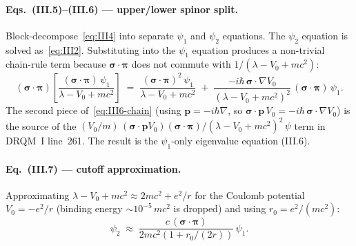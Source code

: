 \paragraph{Eqs.~(III.5)--(III.6) --- upper/lower spinor split.}
Block-decompose~\eqref{eq:III4} into separate $\psi_1$ and $\psi_2$
equations. The $\psi_2$ equation is solved as~\eqref{eq:III2}. Substituting
into the $\psi_1$ equation produces a non-trivial chain-rule term because
$\boldsymbol\sigma\!\cdot\!\boldsymbol\pi$ does not commute with
$1/(\lambda - V_0 + m c^2)$:
\begin{equation}
\label{eq:III6-chain}
(\boldsymbol\sigma\!\cdot\!\boldsymbol\pi)\!\left[
\frac{(\boldsymbol\sigma\!\cdot\!\boldsymbol\pi)\,\psi_1}
     {\lambda - V_0 + m c^2}\right]
\;=\;
\frac{(\boldsymbol\sigma\!\cdot\!\boldsymbol\pi)^2\,\psi_1}
     {\lambda - V_0 + m c^2}
\;+\;
\frac{-i\hbar\,\boldsymbol\sigma\!\cdot\!\nabla V_0}
     {(\lambda - V_0 + m c^2)^2}\,
(\boldsymbol\sigma\!\cdot\!\boldsymbol\pi)\,\psi_1.
\end{equation}
The second piece of~\eqref{eq:III6-chain} (using
$\mathbf{p} = -i\hbar\nabla$, so $\boldsymbol\sigma\!\cdot\!\mathbf{p}\,V_0
= -i\hbar\,\boldsymbol\sigma\!\cdot\!\nabla V_0$) is the source of the
$(V_0/m)\,(\boldsymbol\sigma\!\cdot\!\mathbf{p}V_0)
(\boldsymbol\sigma\!\cdot\!\boldsymbol\pi)/(\lambda - V_0 + m c^2)^2\,\psi$
term in DRQM~I line~261. The result is the $\psi_1$-only eigenvalue
equation (III.6).

\paragraph{Eq.~(III.7) --- cutoff approximation.}
Approximating $\lambda - V_0 + m c^2 \approx 2 m c^2 + e^2/r$ for the
Coulomb potential $V_0 = -e^2/r$ (binding energy $\sim 10^{-5}\,m c^2$ is
dropped) and using $r_0 = e^2/(m c^2)$:
\begin{equation}
\label{eq:III7}
\psi_2 \;\approx\; \frac{c\,(\boldsymbol\sigma\!\cdot\!\boldsymbol\pi)}
                       {2 m c^2\!\left(1 + r_0/(2 r)\right)}\,\psi_1.
\end{equation}

